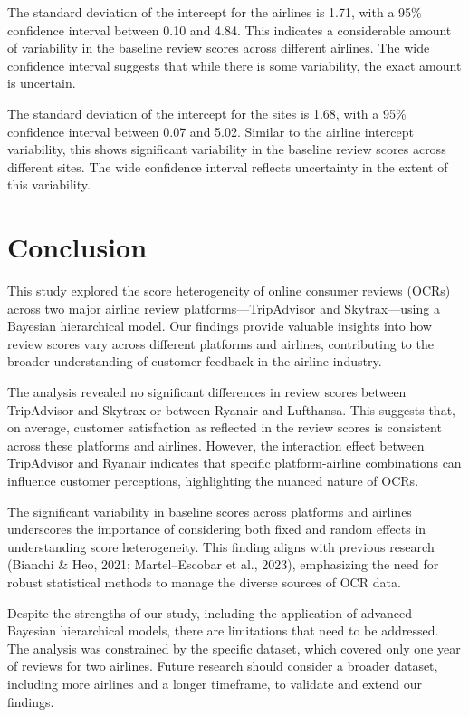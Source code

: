 \documentclass[
]{agujournal2019}
\begin{document}
The standard deviation of the intercept for the airlines is 1.71, with a
95\% confidence interval between 0.10 and 4.84. This indicates a
considerable amount of variability in the baseline review scores across
different airlines. The wide confidence interval suggests that while
there is some variability, the exact amount is uncertain.

The standard deviation of the intercept for the sites is 1.68, with a
95\% confidence interval between 0.07 and 5.02. Similar to the airline
intercept variability, this shows significant variability in the
baseline review scores across different sites. The wide confidence
interval reflects uncertainty in the extent of this variability.

\section{Conclusion}\label{conclusion}

This study explored the score heterogeneity of online consumer reviews
(OCRs) across two major airline review platforms---TripAdvisor and
Skytrax---using a Bayesian hierarchical model. Our findings provide
valuable insights into how review scores vary across different platforms
and airlines, contributing to the broader understanding of customer
feedback in the airline industry.

The analysis revealed no significant differences in review scores
between TripAdvisor and Skytrax or between Ryanair and Lufthansa. This
suggests that, on average, customer satisfaction as reflected in the
review scores is consistent across these platforms and airlines.
However, the interaction effect between TripAdvisor and Ryanair
indicates that specific platform-airline combinations can influence
customer perceptions, highlighting the nuanced nature of OCRs.

The significant variability in baseline scores across platforms and
airlines underscores the importance of considering both fixed and random
effects in understanding score heterogeneity. This finding aligns with
previous research (Bianchi \& Heo, 2021; Martel--Escobar et al., 2023),
emphasizing the need for robust statistical methods to manage the
diverse sources of OCR data.

Despite the strengths of our study, including the application of
advanced Bayesian hierarchical models, there are limitations that need
to be addressed. The analysis was constrained by the specific dataset,
which covered only one year of reviews for two airlines. Future research
should consider a broader dataset, including more airlines and a longer
timeframe, to validate and extend our findings.
\end{document}
